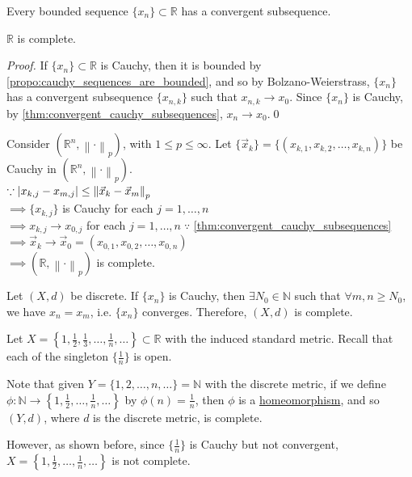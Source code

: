 \documentclass[notoc,notitlepage]{tufte-book}
\newcommand{\norm}[1]{\left\| #1 \right\|}
\begin{document}
\begin{thm}\label{thm:bolzano_weierstrass}
  Every bounded sequence $\{ x_n \} \subset \mathbb{R}$ has a convergent subsequence.
\end{thm}

\begin{thm}\label{thm:r_is_complete}
  $\mathbb{R}$ is complete.
\end{thm}

\begin{proof}
  If $\{ x_n \} \subset \mathbb{R}$ is Cauchy, then it is bounded by \cref{propo:cauchy_sequences_are_bounded}, and so by Bolzano-Weierstrass, $\{ x_n \}$ has a convergent subsequence $\{ x_{n, k} \}$ such that $x_{n, k} \to x_0$. Since $\{ x_n \}$ is Cauchy, by \cref{thm:convergent_cauchy_subsequences}, $x_n \to x_0$.\qed\
\end{proof}

\begin{eg}
  Consider $(\mathbb{R}^n, \norm\cdot_p)$, with $1 \leq p \leq \infty$. Let $\{ \vec{x}_k \} = \{ (x_{k, 1}, x_{k, 2}, \ldots, x_{k, n}) \}$ be Cauchy in $(\mathbb{R}^n, \norm\cdot_p)$. \\
  \noindent$\because \abs{x_{k, j} - x_{m, j} } \leq \norm{\vec{x}_k - \vec{x}_m}_p$ \\
  $\implies \{ x_{k, j} \}$ is Cauchy for each $j = 1, \ldots, n$ \\
  $\implies x_{k, j} \to x_{0, j}$ for each $j = 1, \ldots, n \; \because$ \cref{thm:convergent_cauchy_subsequences} \\
  $\implies \vec{x}_k \to \vec{x}_0 = (x_{0, 1}, x_{0, 2}, \ldots, x_{0, n})$ \\
  $\implies (\mathbb{R}, \norm\cdot_p)$ is complete.
\end{eg}

\begin{eg}
  Let $(X, d)$ be discrete. If $\{ x_n \}$ is Cauchy, then $\exists N_0 \in \mathbb{N}$ such that $\forall m, n \geq N_0$, we have $x_n = x_m$, i.e. $\{ x_n \}$ converges. Therefore, $(X, d)$ is complete.
\end{eg}

\begin{eg}[\imponote]
  Let $X = \left\{ 1, \frac{1}{2}, \frac{1}{3}, \ldots, \frac{1}{n}, \ldots \right\} \subset \mathbb{R}$ with the induced standard metric. Recall that each of the singleton $\{ \frac{1}{n} \}$ is open.

  Note that given $Y = \{ 1, 2, \ldots, n, \ldots \} = \mathbb{N}$ with the discrete metric, if we define $\phi : \mathbb{N} \to \left\{ 1, \frac{1}{2}, \ldots, \frac{1}{n}, \ldots \right\}$ by $\phi(n) = \frac{1}{n}$, then $\phi$ is a \hyperref[defn:homeomorphism]{homeomorphism}, and so $(Y, d)$, where $d$ is the discrete metric, is complete.

  However, as shown before, since $\{ \frac{1}{n} \}$ is Cauchy but not convergent, $X = \left\{ 1, \frac{1}{2}, \ldots, \frac{1}{n}, \ldots \right\}$ is not complete.
\end{eg}
\end{document}
